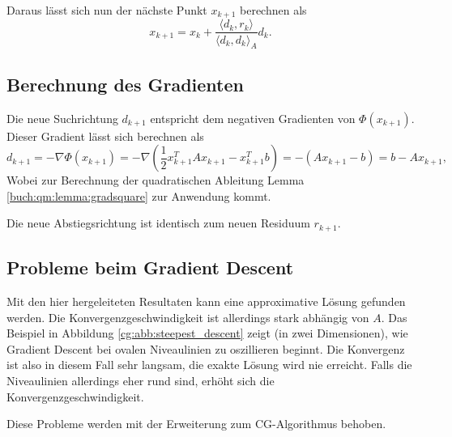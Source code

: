 Daraus lässt sich nun der nächste Punkt $x_{k+1}$ berechnen als
\begin{equation}
	x_{k+1} = x_k + \frac{\langle d_k , r_k \rangle}{\langle d_k , d_k \rangle_A} d_k.
\end{equation}

\subsection{Berechnung des Gradienten}
%
Die neue Suchrichtung $d_{k+1}$ entspricht dem negativen Gradienten von $\Phi(x_{k+1})$.
Dieser Gradient lässt sich berechnen als
\begin{equation}
	d_{k+1} = - \nabla \Phi(x_{k+1}) = - \nabla \left( \frac{1}{2} x_{k+1}^T A x_{k+1} - x_{k+1}^T b \right) = -(Ax_{k+1} - b) = b - Ax_{k+1},
\end{equation}
Wobei zur Berechnung der quadratischen Ableitung Lemma \ref{buch:qm:lemma:gradsquare} zur Anwendung kommt.
%
\begin{beobachtung} \label{cg:beob:residuum}
Die neue Abstiegsrichtung ist identisch zum neuen Residuum $r_{k+1}$.
\end{beobachtung}
%

\subsection{Probleme beim Gradient Descent}
Mit den hier hergeleiteten Resultaten kann eine approximative Lösung gefunden werden.
Die Konvergenzgeschwindigkeit ist allerdings stark abhängig von $A$.
Das Beispiel in Abbildung \ref{cg:abb:steepest_descent} zeigt (in zwei
Dimensionen), wie Gradient Descent bei ovalen Niveaulinien zu oszillieren beginnt.
Die Konvergenz ist also in diesem Fall sehr langsam, die exakte Lösung wird nie erreicht.
Falls die Niveaulinien allerdings eher rund sind, erhöht sich die Konvergenzgeschwindigkeit.

Diese Probleme werden mit der Erweiterung zum CG-Algorithmus behoben.

